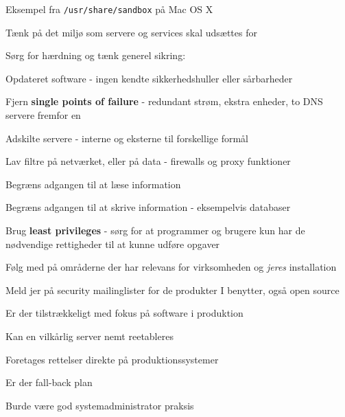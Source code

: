 \documentclass[Screen16to9,17pt]{foils}
\begin{document}
\begin{list1}
\item Eksempel fra \verb+/usr/share/sandbox+ på Mac OS X
\end{list1}




\begin{list1}
\item Tænk på det miljø som servere og services skal udsættes for
\item Sørg for hærdning og tænk generel sikring:
  \begin{list2}
  \item Opdateret software - ingen kendte sikkerhedshuller eller
  sårbarheder
\item Fjern {\bfseries single points of failure} - redundant strøm, ekstra enheder, to DNS servere fremfor en
\item Adskilte servere - interne og eksterne til forskellige formål
\item Lav filtre på netværket, eller på data - firewalls og proxy
  funktioner
\item Begræns adgangen til at læse information
\item Begræns adgangen til at skrive information - eksempelvis databaser
\item Brug {\bfseries least privileges} - sørg for at programmer og brugere
  kun har de nødvendige rettigheder til at kunne udføre opgaver
\item Følg med på områderne der har relevans for virksomheden og
  \emph{jeres} installation
  \end{list2}
  \item Meld jer på security mailinglister for de produkter I benytter, også open source
\end{list1}



\begin{list1}
\item Er der tilstrækkeligt med fokus på software i produktion
\item Kan en vilkårlig server nemt reetableres
\item Foretages rettelser direkte på produktionssystemer
\item Er der fall-back plan
\item Burde være god systemadministrator praksis
\end{list1}
\end{document}
